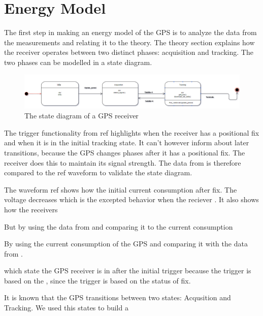  \chapter{Energy Model}
 
 The first step in making an energy model of the GPS is to analyze the data from the measurements and relating it to the theory. The theory section explains how the receiver operates between two distinct phases: acquisition and tracking. The two phases can be modelled in a state diagram. 
 
 
 \begin{figure}[H]
\centering
\includegraphics[width=16 cm]{Project_Report/Images/gps_basics.PNG}
\caption{The state diagram of a GPS receiver}
\label{fig:GPS reciever}
\end{figure}
 
 The trigger functionality from ref highlights when the receiver has a positional fix and when it is in the initial tracking state. It can't however inform about later transitions, because the GPS changes phases after it has a positional fix. The receiver does this to maintain its signal strength. The data from \cite{L76} is therefore compared to the ref waveform to validate the state diagram. 
 
 
 
 The waveform ref shows how the initial current consumption after fix. The voltage decreases which is the excepted behavior when the reciever . It also shows how the receivers 
 
 But by using the data from \cite{L76} and comparing it to the current consumption
 
 
 By using the current consumption of the GPS and comparing it with the data from \cite{L76}.
 
 
 which state the GPS receiver is in after the initial trigger because the trigger is based on the , since the trigger is based on the status of fix. 
 
 
 
 It is known that the GPS transitions between two states: Acqusition and Tracking. We used this states to build a 
 
 
 
